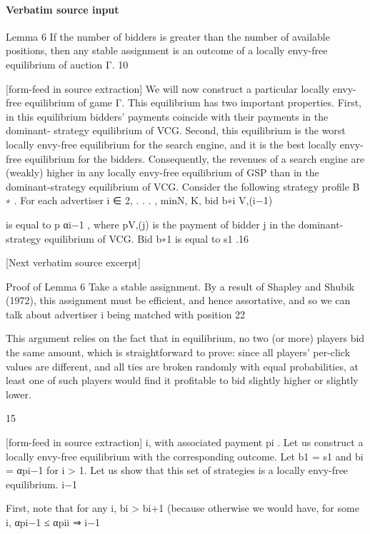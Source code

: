 \documentclass[10pt]{article}
\begin{document}
\paragraph{Verbatim source input}
\begin{ReviewVerbatim}
Lemma 6 If the number of bidders is greater than the number of available positions, then any
stable assignment is an outcome of a locally envy-free equilibrium of auction Γ.
10


[form-feed in source extraction]
We will now construct a particular locally envy-free equilibrium of game Γ. This equilibrium
has two important properties. First, in this equilibrium bidders’ payments coincide with their
payments in the dominant- strategy equilibrium of VCG. Second, this equilibrium is the worst
locally envy-free equilibrium for the search engine, and it is the best locally envy-free equilibrium
for the bidders. Consequently, the revenues of a search engine are (weakly) higher in any locally
envy-free equilibrium of GSP than in the dominant-strategy equilibrium of VCG.
Consider the following strategy profile B ∗ . For each advertiser i ∈ {2, . . . , min{N, K}}, bid b∗i
V,(i−1)

is equal to p αi−1 , where pV,(j) is the payment of bidder j in the dominant-strategy equilibrium of
VCG. Bid b∗1 is equal to s1 .16

[Next verbatim source excerpt]

Proof of Lemma 6
Take a stable assignment. By a result of Shapley and Shubik (1972), this assignment must be
efficient, and hence assortative, and so we can talk about advertiser i being matched with position
22

This argument relies on the fact that in equilibrium, no two (or more) players bid the same amount, which is
straightforward to prove: since all players’ per-click values are different, and all ties are broken randomly with equal
probabilities, at least one of such players would find it profitable to bid slightly higher or slightly lower.

15


[form-feed in source extraction]
i, with associated payment pi .
Let us construct a locally envy-free equilibrium with the corresponding outcome. Let b1 = s1
and bi = αpi−1
for i > 1. Let us show that this set of strategies is a locally envy-free equilibrium.
i−1

First, note that for any i, bi > bi+1 (because otherwise we would have, for some i, αpi−1
≤ αpii ⇒
i−1


\end{ReviewVerbatim}
\end{document}
